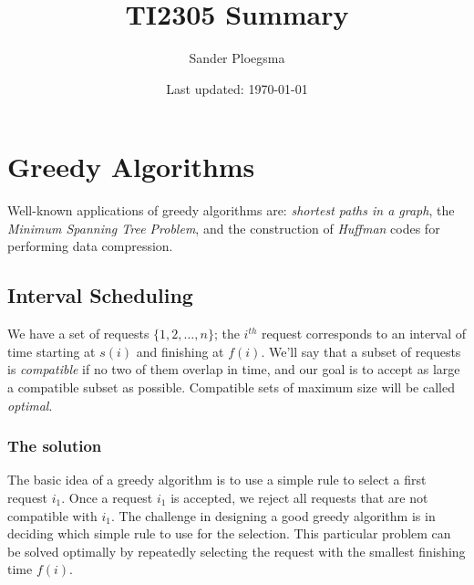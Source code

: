 \documentclass[]{article}
\begin{document}
\title{TI2305 Summary}
\author{Sander Ploegsma}
\date{Last updated: \today}
\maketitle

\newcommand{\abs}[1]{\lvert #1 \rvert}
\newcommand{\uf}{\texttt{Union-Find} }
\newtheorem{theorem}{Theorem}

\tableofcontents

\section{Greedy Algorithms}
	Well-known applications of greedy algorithms are: \emph{shortest paths in a graph}, the \emph{Minimum Spanning Tree Problem}, and the construction of \emph{Huffman} codes for performing data compression. 
	
	\subsection{Interval Scheduling} \label{subsec:interval}
		We have a set of requests $\{1,2,\dots,n\}$; the $i^{th}$ request corresponds to an interval of time starting at $s(i)$ and finishing at $f(i)$. We'll say that a subset of requests is \emph{compatible} if no two of them overlap in time, and our goal is to accept as large a compatible subset as possible. Compatible sets of maximum size will be called \emph{optimal}. \\
		
		\subsubsection{The solution}
			The basic idea of a greedy algorithm is to use a simple rule to select a first request $i_1$. Once a request $i_1$ is accepted, we reject all requests that are not compatible with $i_1$. The challenge in designing a good greedy algorithm is in deciding which simple rule to use for the selection. This particular problem can be solved optimally by repeatedly selecting the request with the smallest finishing time $f(i)$. \\
		
\end{document}
